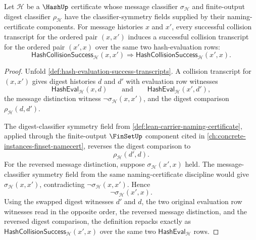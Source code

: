 \begin{theorem}
\label{thm:hash-collision-transcript-symmetry}
Let $\mathcal H$ be a $\HashUp$ certificate whose message classifier $\sigma_{\mathcal H}$ and finite-output digest classifier $\rho_{\mathcal H}$ have the classifier-symmetry fields supplied by their naming-certificate components. For message histories $x$ and $x'$, every successful collision transcript for the ordered pair $(x,x')$ induces a successful collision transcript for the ordered pair $(x',x)$ over the same two hash-evaluation rows:
$$
\mathsf{HashCollisionSuccess}_{\mathcal H}(x,x')
\Longrightarrow
\mathsf{HashCollisionSuccess}_{\mathcal H}(x',x).
$$
\end{theorem}
\begin{proof}
Unfold \autoref{def:hash-evaluation-success-transcripts}. A collision transcript for $(x,x')$ gives digest histories $d$ and $d'$ with evaluation row witnesses
$$
\mathsf{HashEval}_{\mathcal H}(x,d)
\qquad\text{and}\qquad
\mathsf{HashEval}_{\mathcal H}(x',d'),
$$
the message distinction witness $\neg\sigma_{\mathcal H}(x,x')$, and the digest comparison $\rho_{\mathcal H}(d,d')$.

The digest-classifier symmetry field from \autoref{def:lean-carrier-naming-certificate}, applied through the finite-output $\FinSetUp$ component cited in \autoref{ch:concrete-instances-finset-namecert}, reverses the digest comparison to
$$
\rho_{\mathcal H}(d',d).
$$
For the reversed message distinction, suppose $\sigma_{\mathcal H}(x',x)$ held. The message-classifier symmetry field from the same naming-certificate discipline would give $\sigma_{\mathcal H}(x,x')$, contradicting $\neg\sigma_{\mathcal H}(x,x')$. Hence
$$
\neg\sigma_{\mathcal H}(x',x).
$$
Using the swapped digest witnesses $d'$ and $d$, the two original evaluation row witnesses read in the opposite order, the reversed message distinction, and the reversed digest comparison, the definition repacks exactly as $\mathsf{HashCollisionSuccess}_{\mathcal H}(x',x)$ over the same two $\mathsf{HashEval}_{\mathcal H}$ rows.
\end{proof}

